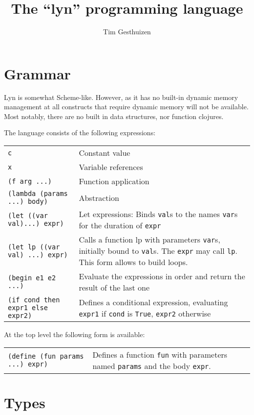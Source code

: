 \documentclass[a4paper, 11pt]{article}
\title{The ``lyn'' programming language}
\author{Tim Gesthuizen}
\begin{document}
\maketitle

\section{Grammar}

Lyn is somewhat Scheme-like.
However, as it has no built-in dynamic memory management at all
constructs that require dynamic memory will not be available.
Most notably, there are no built in data structures, nor function
clojures.

The language consists of the following expressions:\\[1.5ex]
\begin{tabularx}{\linewidth}{lX}
  \texttt{c} & Constant value\\
  \texttt{x} & Variable references\\
  \texttt{(f arg ...)} & Function application\\
  \texttt{(lambda (params ...) body)} & Abstraction\\
  \texttt{(let ((var val)...) expr)} & Let expressions:
  Binds \texttt{val}s to the names \texttt{var}s for the duration of
  \texttt{expr}\\
  \texttt{(let lp ((var val) ...) expr)} & Calls a function lp with
  parameters \texttt{var}s, initially bound to \texttt{val}s.
  The \texttt{expr} may call \texttt{lp}.
  This form allows to build loops.\\
  \texttt{(begin e1 e2 ...)} & Evaluate the expressions in order and
  return the result of the last one\\
  \texttt{(if cond then expr1 else expr2)} & Defines a conditional
  expression, evaluating \texttt{expr1} if \texttt{cond} is
  \texttt{True}, \texttt{expr2} otherwise\\
\end{tabularx}

At the top level the following form is available:\\[1.5ex]
\begin{tabularx}{\linewidth}{lX}
  \texttt{(define (fun params ...) expr)} & Defines a function
  \texttt{fun} with parameters named \texttt{params} and the body
  \texttt{expr}.
\end{tabularx}

\section{Types}
\end{document}
